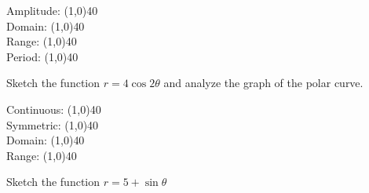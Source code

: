 \documentclass[addpoints]{exam}
\begin{document}
\begin{questions}
        \begin{left} 
        \end{left}
    
    Amplitude: \line(1,0){40} \\
    \newline
    Domain: \line(1,0){40} \\
    \newline
    Range: \line(1,0){40} \\
    \newline
    Period: \line(1,0){40} \\
    
    
    \question[1] Sketch the function $r = 4\cos 2\theta$ and analyze the graph of the polar curve.
    
        \begin{left} 
        \end{left}
    
    Continuous: \line(1,0){40} \\
    \newline
    Symmetric: \line(1,0){40} \\
    \newline
    Domain: \line(1,0){40} \\
    \newline
    Range: \line(1,0){40} \\
    
    \newpage
    \question[1] Sketch the function $r = 5 + \sin\theta$
    
        \begin{left} 
        \end{left}
    

\end{questions}
\end{document}
